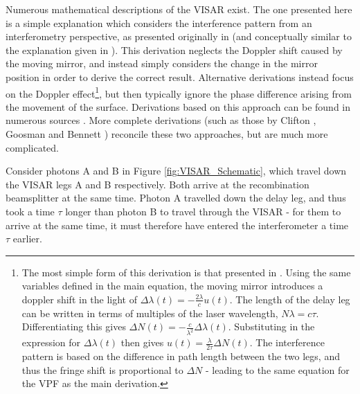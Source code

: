 Numerous mathematical descriptions of the VISAR exist. The one presented here is a simple explanation which considers the interference pattern from an interferometry perspective, as presented originally in \cite{Barker1968} (and conceptually similar to the explanation given in \cite{Barker2000}). This derivation neglects the Doppler shift caused by the moving mirror, and instead simply considers the change in the mirror position in order to derive the correct result. Alternative derivations instead focus on the Doppler effect\footnote{The most simple form of this derivation is that presented in \cite{Barker1968}. Using the same variables defined in the main equation, the moving mirror introduces a doppler shift in the light of $\Delta \lambda (t) = - \frac{2 \lambda}{c} u(t)$. The length of the delay leg can be written in terms of multiples of the laser wavelength, $N \lambda = c \tau$. Differentiating this gives $\Delta N(t) = - \frac{c}{\lambda^2}\Delta \lambda (t)$. Substituting in the expression for $\Delta \lambda (t)$ then gives $u(t) = \frac{\lambda}{2\tau} \Delta N(t)$. The interference pattern is based on the difference in path length between the two legs, and thus the fringe shift is proportional to $\Delta N$ - leading to the same equation for the VPF as the main derivation.}, but then typically ignore the phase difference arising from the movement of the surface. Derivations based on this approach can be found in numerous sources \cite{Barker1968, Barker1972, Barker2000, Hammel2018}. More complete derivations (such as those by Clifton \cite{Goosman1975a}, Goosman \cite{Goosman1975} and Bennett \cite{Bennett2016}) reconcile these two approaches, but are much more complicated.

Consider photons A and B in Figure \ref{fig:VISAR_Schematic}, which travel down the VISAR legs A and B respectively. Both arrive at the recombination beamsplitter at the same time. Photon A travelled down the delay leg, and thus took a time $\tau$ longer than photon B to travel through the VISAR - for them to arrive at the same time, it must therefore have entered the interferometer a time $\tau$ earlier.

